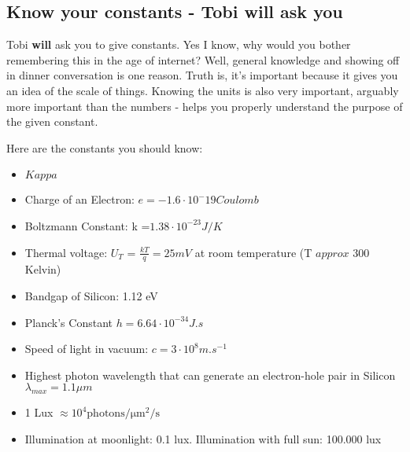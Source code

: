 \subsection{Know your constants - Tobi will ask you}

Tobi \textbf{will} ask you to give constants. Yes I know, why would you bother remembering this in the age of internet? Well, general knowledge and showing off in dinner conversation is one reason. Truth is, it's important because it gives you an idea of the scale of things. Knowing the units is also very important, arguably more important than the numbers - helps you properly understand the purpose of the given constant.

Here are the constants you should know: 

\begin{itemize}
    \item $Kappa$
    \item Charge of an Electron: $e = -1.6 \cdot 10^-19 Coulomb$
    \item Boltzmann Constant: k =$1.38 \cdot 10^{-23} J/K$
    \item Thermal voltage: $U_T$ = $\frac{kT}{q} = 25mV$ at room temperature (T $approx$ 300 Kelvin)
    \item Bandgap of Silicon: 1.12 eV
    \item Planck's Constant $h = 6.64 \cdot 10^{-34} J.s$
    \item Speed of light in vacuum: $c = 3 \cdot 10^8 m.s^{-1}$
    \item Highest photon wavelength that can generate an electron-hole pair in Silicon $\lambda_{max} = 1.1 \mu m$
    \item 1 Lux $\approx 10^4 \mathrm{photons/\mu m^2/s}$
    \item Illumination at moonlight: 0.1 lux. Illumination with full sun: 100.000 lux 
\end{itemize}